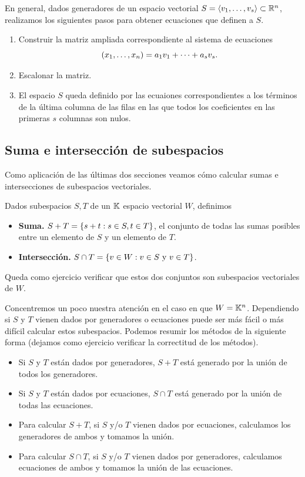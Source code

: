En general, dados generadores de un espacio vectorial $S = \langle \vb_1, \dots, \vb_s \rangle \subset \R^n$, realizamos los siguientes pasos para obtener ecuaciones que definen a $S$.
\begin{enumerate}
\item Construir la matriz ampliada correspondiente al sistema de ecuaciones
$$
(x_1, \dots, x_n) = a_1 \vb_1 + \dots + a_s \vb_s.
$$
\item Escalonar la matriz.
\item El espacio $S$ queda definido por las ecuaiones correspondientes a los términos de la \'ultima columna de las filas en las que todos los coeficientes en las primeras $s$ columnas son nulos.
\end{enumerate}

\subsection{Suma e intersecci\'on de subespacios}

Como aplicación de las últimas dos secciones veamos cómo calcular sumas e intersecciones de subespacios vectoriales.

\tccdefi
\begin{definicion}
Dados subespacios $S, T$ de un $\mathbb K$ espacio vectorial $W$, definimos
\begin{itemize}
\item \textbf{Suma.} $S + T = \{ \sbb + \tbb : \sbb \in S, \tbb \in T\}$, el conjunto de todas las sumas posibles entre un elemento de $S$ y un elemento de $T$.
\item \textbf{Intersección.} $S \cap T = \{ \vb \in W: \vb \in S \text{ y } \vb \in T\}$.
\end{itemize}
\end{definicion}
\etcc
Queda como ejercicio verificar que estos dos conjuntos son subespacios vectoriales de $W$.

Concentremos un poco nuestra atención en el caso en que $W=\mathbb K^n$. Dependiendo si $S$ y $T$ vienen dados por generadores o ecuaciones puede ser más fácil o más difícil calcular estos subespacios. Podemos resumir los métodos de la siguiente forma (dejamos como ejercicio verificar la correctitud de los métodos).

\begin{itemize}
\item Si $S$ y $T$ est\'an dados por generadores, $S + T$ est\'a generado por la unión de todos los generadores.
\item Si $S$ y $T$ est\'an dados por ecuaciones, $S \cap T$ est\'a generado por la unión de todas las ecuaciones.
\item Para calcular $S + T$, si $S$ y/o $T$ vienen dados por ecuaciones, calculamos los generadores de ambos y tomamos la unión.
\item Para calcular $S \cap T$, si $S$ y/o $T$ vienen dados por generadores, calculamos ecuaciones de ambos y tomamos la unión de las ecuaciones.
\end{itemize}

